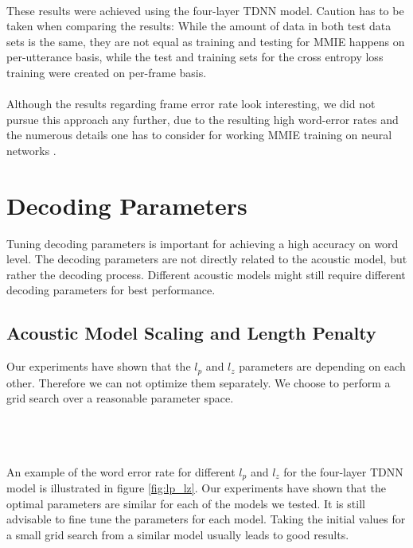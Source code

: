 \fi
\\ These results were achieved using the four-layer TDNN model. Caution has to be taken when comparing the results: While the amount of data in both test data sets is the same, they are not equal as training and testing for MMIE happens on per-utterance basis, while the test and training sets for the cross entropy loss training were created on per-frame basis. \\ \\
Although the results regarding frame error rate look interesting, we did not pursue this approach any further, due to the resulting high word-error rates and the numerous details one has to consider for working MMIE training on neural networks \cite{su2013error}.

\section{Decoding Parameters}
Tuning decoding parameters is important for achieving a high accuracy on word level. The decoding parameters are not directly related to the acoustic model, but rather the decoding process. Different acoustic models might still require different decoding parameters for best performance. 
\subsection{Acoustic Model Scaling and Length Penalty}
Our experiments have shown that the $l_p$ and $l_z$ parameters are depending on each other. Therefore we can not optimize them separately. We choose to perform a grid search over a reasonable parameter space. \\ \\
\begin{minipage}{\linewidth}
\centering
{}
\label{fig:lp_lz}
\end{minipage}
\\ \\
An example of the word error rate for different $l_p$ and $l_z$ for the four-layer TDNN model is illustrated in figure \ref{fig:lp_lz}. Our experiments have shown that the optimal parameters are similar for each of the models we tested. It is still advisable to fine tune the parameters for each model. Taking the initial values for a small grid search from a similar model usually leads to good results.
